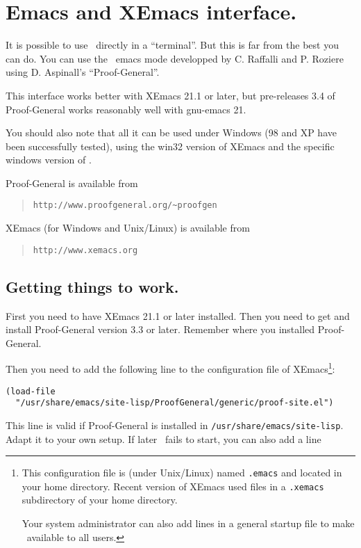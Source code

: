 
\chapter{Emacs and XEmacs interface.}\label{interface}

It is possible to use \AFD\ directly in a ``terminal''. But this is
far from the best you can do. You can use the \AFD\ emacs mode developped by
C. Raffalli and P. Roziere using D. Aspinall's ``Proof-General''.

This interface works better with XEmacs 21.1 or later, but pre-releases 3.4 of
Proof-General works reasonably well with gnu-emacs 21.

You should also note that all it can be used under Windows (98 and
XP have been successfully tested), using the win32 version of XEmacs and the specific
windows version of \AFD.

Proof-General is available from
\begin{quote}
\verb#http://www.proofgeneral.org/~proofgen#
\end{quote}

XEmacs (for Windows and Unix/Linux) is available from
\begin{quote}
\verb#http://www.xemacs.org#
\end{quote}

\section{Getting things to work.}

First you need to have XEmacs 21.1 or later installed. Then you need
to get and install Proof-General version 3.3 or later. Remember where
you installed  Proof-General.

Then you need to add the following line to the configuration file of
XEmacs\footnote{
This configuration file is (under Unix/Linux) named {\tt .emacs} and
located in your home directory. Recent version of XEmacs used files in
a {\tt .xemacs} subdirectory of your home directory.

Your system administrator can also add lines in a general startup
file to make \AFD\ available to all users.}:
\begin{verbatim}
(load-file
  "/usr/share/emacs/site-lisp/ProofGeneral/generic/proof-site.el")
\end{verbatim}

This line is valid if Proof-General is installed in
\verb#/usr/share/emacs/site-lisp#. Adapt it to your own setup.
If later \AFD\ fails to start, you can also add a line

